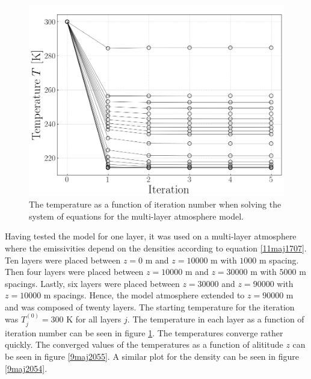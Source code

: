 \documentclass[twocolumn]{article}
\begin{document}
\begin{large}
\begin{figure}[!t]
\begin{center}
        \includegraphics[scale=0.35]{Iteration.png}
    \end{center}
    \caption{The temperature as a function of iteration number when solving the system of equations for the multi-layer atmosphere model.}
    \label{9maj2056}
\end{figure}

Having tested the model for one layer, it was used on a multi-layer atmosphere where the emissivities depend on the densities according to equation \eqref{11maj1707}. Ten layers were placed between $z=0$ m and $z=10000$ m with $1000$ m spacing. Then four layers were placed between $z=10000$ m and $z=30000$ m with $5000$ m spacings. Lastly, six layers were placed between $z=30000$ and $z=90000$ with $z=10000$ m spacings. Hence, the model atmosphere extended to $z=90000$ m and was composed of twenty layers. The starting temperature for the iteration was $T_j^{(0)}=300$ K for all layers $j$. The temperature in each layer as a function of iteration number can be seen in figure \ref{9maj2056}. The temperatures converge rather quickly. The converged values of the temperatures as a function of alititude $z$ can be seen in figure \ref{9maj2055}. A similar plot for the density can be seen in figure \ref{9maj2054}. 


\end{large}
\end{document}
